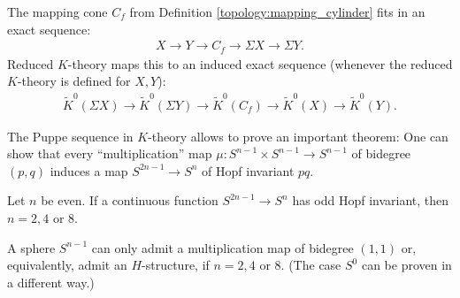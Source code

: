 {    \begin{property}
        The mapping cone $C_f$ from Definition \ref{topology:mapping_cylinder} fits in an exact sequence:
        \begin{gather}
            X\longrightarrow Y\longrightarrow C_f\longrightarrow\Sigma X\longrightarrow\Sigma Y.
        \end{gather}
        Reduced $K$-theory maps this to an induced exact sequence (whenever the reduced $K$-theory is defined for $X,Y$):
        \begin{gather}
            \widetilde{K}^0(\Sigma X)\longrightarrow\widetilde{K}^0(\Sigma Y)\longrightarrow \widetilde{K}^0(C_f)\longrightarrow\widetilde{K}^0(X)\longrightarrow\widetilde{K}^0(Y).
        \end{gather}
    \end{property}
    The Puppe sequence in $K$-theory allows to prove an important theorem:
     One can show that every ``multiplication'' map $\mu:S^{n-1}\times S^{n-1}\rightarrow S^{n-1}$ of bidegree $(p,q)$ induces a map $S^{2n-1}\rightarrow S^n$ of Hopf invariant $pq$.

     \begin{theorem}
         Let $n$ be even. If a continuous function $S^{2n-1}\rightarrow S^n$ has odd Hopf invariant, then $n=2,4$ or 8.
     \end{theorem}
     \begin{result}
         A sphere $S^{n-1}$ can only admit a multiplication map of bidegree $(1,1)$ or, equivalently, admit an $H$-structure, if $n=2,4$ or 8. (The case $S^0$ can be proven in a different way.)
     \end{result}

}
